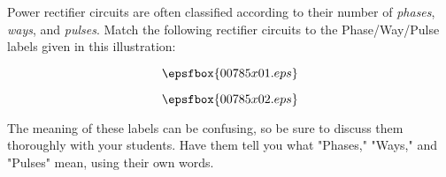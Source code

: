 

Power rectifier circuits are often classified according to their number of {\it phases}, {\it ways}, and {\it pulses}.  Match the following rectifier circuits to the Phase/Way/Pulse labels given in this illustration:

$$\epsfbox{00785x01.eps}$$







$$\epsfbox{00785x02.eps}$$







The meaning of these labels can be confusing, so be sure to discuss them thoroughly with your students.  Have them tell you what "Phases," "Ways," and "Pulses" mean, using their own words.




